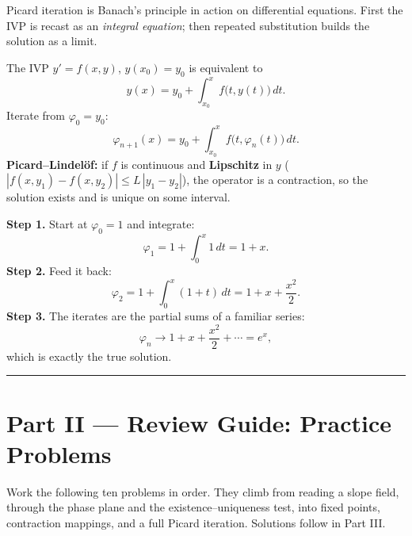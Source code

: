 Picard iteration is Banach's principle in action on differential equations.
First the IVP is recast as an \emph{integral equation}; then repeated
substitution builds the solution as a limit.

\begin{formulabox}
The IVP $y' = f(x,y)$, $y(x_0)=y_0$ is equivalent to
\[ y(x) = y_0 + \int_{x_0}^{x} f\big(t, y(t)\big)\,dt. \]
Iterate from $\varphi_0 = y_0$:
\[ \varphi_{n+1}(x) = y_0 + \int_{x_0}^{x} f\big(t, \varphi_n(t)\big)\,dt. \]
\textbf{Picard--Lindel\"of:} if $f$ is continuous and \textbf{Lipschitz} in $y$
($|f(x,y_1)-f(x,y_2)| \le L\,|y_1-y_2|$), the operator is a contraction, so the
solution exists and is unique on some interval.
\end{formulabox}

\begin{examplebox}[Worked Example 3.6: Picard iterates for $y'=y,\ y(0)=1$]
\textbf{Step 1.} Start at $\varphi_0 = 1$ and integrate:
\[ \varphi_1 = 1 + \int_0^x 1\,dt = 1 + x. \]
\textbf{Step 2.} Feed it back:
\[ \varphi_2 = 1 + \int_0^x (1+t)\,dt = 1 + x + \frac{x^2}{2}. \]
\textbf{Step 3.} The iterates are the partial sums of a familiar series:
\[ \varphi_n \to 1 + x + \frac{x^2}{2} + \cdots = e^{x}, \]
which is exactly the true solution.
\end{examplebox}

\vspace{0.4em}
\hrule
\vspace{0.6em}

\clearpage
{}
{}
\section*{Part II --- Review Guide: Practice Problems}

Work the following ten problems in order. They climb from reading a slope field,
through the phase plane and the existence--uniqueness test, into fixed points,
contraction mappings, and a full Picard iteration. Solutions follow in Part III.

